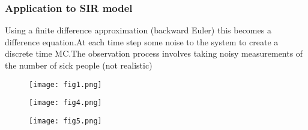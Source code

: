 \documentclass{beamer}
\begin{document}
\frame
{
\frametitle{Application to SIR model}
Using a finite difference approximation (backward Euler) this becomes a difference equation.\newline\newline At each time step some noise to the system to create a discrete time MC.\newline\newline The observation process involves taking noisy measurements of the number of sick people (not realistic)
}

\frame
{
\begin{figure}[htb]
\texttt{[image: fig1.png]}
\end{figure}
}

\frame
{
\begin{figure}[htb]
\texttt{[image: fig4.png]}
\end{figure}
}

\frame
{
\begin{figure}[htb]
\texttt{[image: fig5.png]}
\end{figure}
}
\end{document}
